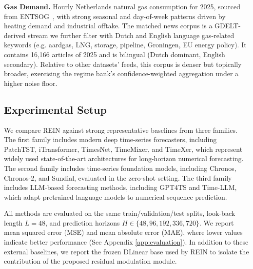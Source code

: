 \documentclass{article}
\newcommand{\method}{REIN\xspace}
\begin{document}
\textbf{Gas Demand.} Hourly Netherlands natural gas consumption for 2025, sourced from ENTSOG~\citep{entsog}, with strong seasonal and day-of-week patterns driven by heating demand and industrial offtake.
The matched news corpus is a GDELT-derived stream we further filter with Dutch and English language gas-related keywords (e.g. aardgas, LNG, storage, pipeline, Groningen, EU energy policy). It contains 16{,}166 articles of 2025 and is bilingual (Dutch dominant, English secondary). Relative to other datasets' feeds, this corpus is denser but topically broader, exercising the regime bank's confidence-weighted aggregation under a higher noise floor.


\subsection{Experimental Setup}
\label{sec:experimental_setup}
We compare \method against strong representative baselines from three families. The first family includes modern deep time-series forecasters, including PatchTST\citep{patchtst_nie2023}, iTransformer\citep{itransformer_liu2024}, TimesNet\citep{wu2023timesnettemporal2dvariationmodeling}, TimeMixer\citep{wang2024timemixerdecomposablemultiscalemixing}, and TimeXer\citep{wang2024timexerempoweringtransformerstime}, which represent widely used state-of-the-art architectures for long-horizon numerical forecasting. The second family includes time-series foundation models, including Chronos\citep{ansari2024chronoslearninglanguagetime}, Chronos-2\citep{ansari2025chronos2univariateuniversalforecasting}, and Sundial\citep{liu2025sundialfamilyhighlycapable}, evaluated in the zero-shot setting. The third family includes LLM-based forecasting methods, including GPT4TS\citep{zhou2023fitsallpowergeneraltime} and Time-LLM\citep{timellm_jin2024}, which adapt pretrained language models to numerical sequence prediction.

All methods are evaluated on the same train/validation/test splits, look-back length $L=48$, and prediction horizons $H\in\{48,96,192,336,720\}$. We report mean squared error (MSE) and mean absolute error (MAE), where lower values indicate better performance (See Appendix \ref{app:evaluation}). In addition to these external baselines, we report the frozen DLinear base used by \method to isolate the contribution of the proposed residual modulation module.
\end{document}

